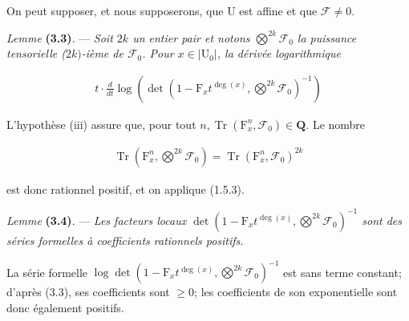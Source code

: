 \documentclass[10pt,leqno]{article}
\begin{document}
\par

\noindent On peut supposer, et nous supposerons, que \(\mathrm{U}\) est affine et que \(\mathcal{F} \ne 0\).\par

\noindent \emph{Lemme} \textbf{(3.3)}. — {\itshape Soit \(2k\) un entier pair et notons \(\bigotimes\limits^{2k}\mathcal{F} _{0}\) la puissance tensorielle (\(2k)\)-ième de \(\mathcal{F} _{0}\). Pour \(x\in |\mathrm{U}_{0}|\), la dérivée logarithmique}\par

\begin{equation*}\begin{gathered}t\cdot \frac{d}{dt} \operatorname{log}(\operatorname{det}(1- \mathrm{F}_{x} t^{\operatorname{deg}(x)},\bigotimes\limits^{2k}\mathcal{F} _{0})^{- 1})\end{gathered}\end{equation*}

\par

\noindent L’hypothèse (iii) assure que, pour tout \(n, \operatorname{Tr}(\mathrm{F}_{x}^{n},\mathcal{F} _{0})\in \mathbf{Q}\). Le nombre\par

\begin{equation*}\begin{gathered}\operatorname{Tr}(\mathrm{F}_{x}^{n},\bigotimes\limits^{2k}\mathcal{F} _{0}) = \operatorname{Tr}(\mathrm{F}_{x}^{n},\mathcal{F} _{0})^{2k}\end{gathered}\end{equation*}

\noindent est donc rationnel positif, et on applique (1.5.3).\par

\noindent \emph{Lemme} \textbf{(3.4)}. — {\itshape Les facteurs locaux \(\operatorname{det}(1- \mathrm{F}_{x} t^{\operatorname{deg}(x)},\bigotimes\limits^{2k}\mathcal{F} _{0})^{- 1}\) sont des séries formelles à coefficients rationnels positifs.}\par

\noindent La série formelle \(\operatorname{log} \operatorname{det}(1- \mathrm{F}_{x} t^{\operatorname{deg}(x)},\bigotimes\limits^{2k}\mathcal{F} _{0})^{- 1}\) est sans terme constant; d’après (3.3), ses coefficients sont \(\geq 0\); les coefficients de son exponentielle sont donc également positifs.\par
\end{document}
